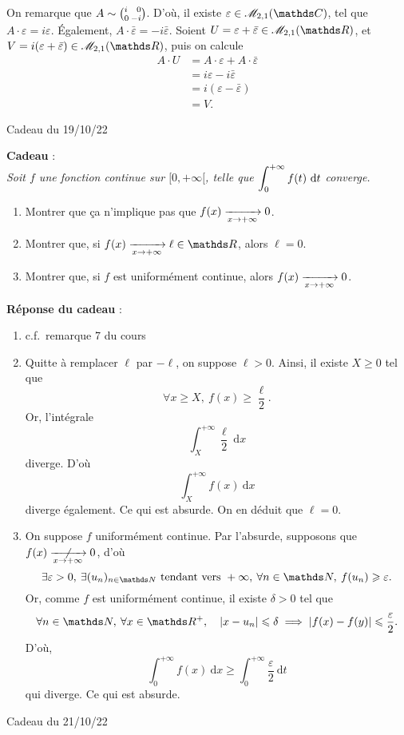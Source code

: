 \documentclass[a4paper]{article}
\begin{document}
	On remarque que $A \sim {i\hfill\:0\choose0\hfill\:-i}$. D'où, il existe $\varepsilon \in \mathscr{M}_{2,1}(\C)$, tel que $A\cdot \varepsilon = i \varepsilon$. Également, $A \cdot \bar\varepsilon = -i \bar\varepsilon$. Soient $U = \varepsilon + \bar\varepsilon \in \mathscr{M}_{2,1}(\R)$, et $V = i(\varepsilon + \bar\varepsilon) \in \mathscr{M}_{2,1}(\R)$, puis on calcule
	\begin{align*}
		A \cdot U &= A\cdot \varepsilon + A\cdot \bar\varepsilon \\
		&= i \varepsilon - i\bar\varepsilon \\
		&= i(\varepsilon - \bar\varepsilon) \\
		&= V.
	\end{align*}
	\clearpage
	\centerline{\LARGE Cadeau du 19/10/22}
	\bigskip
	\bigskip
	{\bf Cadeau} :\\
	\slshape
	Soit $f$\/ une fonction continue sur $[0, +\infty[$, telle que $\displaystyle\int_{0}^{+\infty} f(t)~\mathrm{d}t$\/ converge. 
	\begin{enumerate}
		\item Montrer que ça n'implique pas que $f(x) \xrightarrow[x\to +\infty]{} 0$.
		\item Montrer que, si $f(x) \tendsto{x\to +\infty} \ell \in \R$, alors $\ell = 0$.
		\item Montrer que, si $f$\/ est uniformément continue, alors $f(x) \xrightarrow[x\to +\infty]{} 0$.
	\end{enumerate}
	\upshape
	\bigskip
	\bigskip

	{\bf Réponse du cadeau} :
	\begin{enumerate}
		\item c.f.\ remarque 7 du cours
		\item Quitte à remplacer $\ell$\/ par $-\ell$, on suppose $\ell > 0$. Ainsi, il existe $X \ge 0$\/ tel que \[\forall x \ge X,\: f(x) \ge \frac{\ell}{2}.\] Or, l'intégrale \[\int_{X}^{+\infty} \frac{\ell}{2}~\mathrm{d}x\] diverge. D'où \[\int_{X}^{+\infty} f(x)~\mathrm{d}x\] diverge également. Ce qui est absurde.
			On en déduit que $\ell = 0$.
		\item On suppose $f$\/ uniformément continue. Par l'absurde, supposons que $f(x) \centernot{\tendsto{x\to +\infty}} 0$, d'où \[
				\exists \varepsilon > 0,\:\exists (u_n)_{n \in \N} \text{ tendant vers } +\infty,\:\forall n \in \N,\:f(u_n) \ge \varepsilon
			.\] Or, comme $f$\/ est uniformément continue, il existe $\delta > 0$\/ tel que \[
				\forall n \in \N,\:\forall x \in \R^+,\quad |x-u_n| \le \delta \implies |f(x) - f(y)| \le \frac{\varepsilon}{2}
			.\] D'où, \[
			\int_{0}^{+\infty} f(x)~\mathrm{d}x \ge \int_{0}^{+\infty} \frac{\varepsilon}{2}~\mathrm{d}t
			\] qui diverge. Ce qui est absurde.
	\end{enumerate}
	\clearpage
	\centerline{\LARGE Cadeau du 21/10/22}
\end{document}

